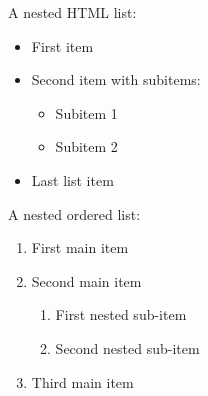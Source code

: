 \documentclass[11pt,a4paper]{article}
\begin{document}
A nested HTML list:

\begin{itemize}
\item First item
\item Second item with subitems:
  \begin{itemize}
\item Subitem 1
\item Subitem 2
  \end{itemize}
\item Last list item
\end{itemize}

A nested ordered list:

\begin{enumerate}
\item First main item
\item Second main item
  \begin{enumerate}
\item First nested sub-item
\item Second nested sub-item
  \end{enumerate}
\item Third main item
\end{enumerate}
\end{document}
